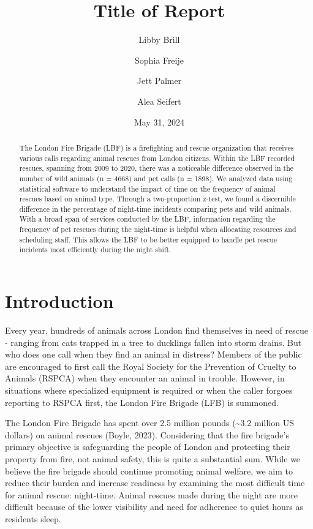 \documentclass[
]{article}
\title{Title of Report}
\author[1]{Libby Brill}
\author[1]{Sophia Freije}
\author[1]{Jett Palmer}
\author[1]{Alea Seifert}
\affil[1]{Department of Statistics, Cal Poly - SLO}
\date{May 31, 2024}
\begin{document}
\maketitle
\begin{abstract}
The London Fire Brigade (LBF) is a firefighting and rescue organization
that receives various calls regarding animal rescues from London
citizens. Within the LBF recorded rescues, spanning from 2009 to 2020,
there was a noticeable difference observed in the number of wild animals
(n = 4668) and pet calls (n = 1898). We analyzed data using statistical
software to understand the impact of time on the frequency of animal
rescues based on animal type. Through a two-proportion z-test, we found
a discernible difference in the percentage of night-time incidents
comparing pets and wild animals. With a broad span of services conducted
by the LBF, information regarding the frequency of pet rescues during
the night-time is helpful when allocating resources and scheduling
staff. This allows the LBF to be better equipped to handle pet rescue
incidents most efficiently during the night shift.
\end{abstract}
\ifdefined\Shaded\renewenvironment{Shaded}{\begin{tcolorbox}[sharp corners, boxrule=0pt, enhanced, interior hidden, borderline west={3pt}{0pt}{shadecolor}, frame hidden, breakable]}{\end{tcolorbox}}\fi

\hypertarget{intro}{%
\section{Introduction}\label{intro}}

Every year, hundreds of animals across London find themselves in need of
rescue - ranging from cats trapped in a tree to ducklings fallen into
storm drains. But who does one call when they find an animal in
distress? Members of the public are encouraged to first call the Royal
Society for the Prevention of Cruelty to Animals (RSPCA) when they
encounter an animal in trouble. However, in situations where specialized
equipment is required or when the caller forgoes reporting to RSPCA
first, the London Fire Brigade (LFB) is summoned.

The London Fire Brigade has spent over 2.5 million pounds
(\textasciitilde3.2 million US dollars) on animal rescues (Boyle, 2023).
Considering that the fire brigade's primary objective is safeguarding
the people of London and protecting their property from fire, not animal
safety, this is quite a substantial sum. While we believe the fire
brigade should continue promoting animal welfare, we aim to reduce their
burden and increase readiness by examining the most difficult time for
animal rescue: night-time. Animal rescues made during the night are more
difficult because of the lower visibility and need for adherence to
quiet hours as residents sleep.
\end{document}
